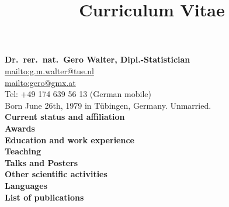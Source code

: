\documentclass[a4paper]{simplecv}
\begin{document}
\pagestyle{myheadings}




\title{Curriculum Vitae}
\nocite{itip-statinf,Troffaes2014a,diss,Walter2012b,Troffaes2012a,Walter2011a,Walter2010a,%
Walter2009b,Walter2009a,Walter2007c,Walter2007b,Walter2007a,Walter2006a}

\vspace*{-10ex}
\maketitle

\textbf{\large Dr.\ rer.\ nat.\ Gero Walter, Dipl.-Statistician}\\[2ex]
\url{mailto:g.m.walter@tue.nl}\\
\url{mailto:gero@gmx.at}\\
Tel: +49 174 639 56 13 (German mobile)\\

Born June 26th, 1979 in T\"{u}bingen, Germany. Unmarried.\\

\textbf{\sf Current status and affiliation} \dotfill \pageref{current}\\
\textbf{\sf Awards} \dotfill \pageref{awards}\\
\textbf{\sf Education and work experience} \dotfill \pageref{education}\\
\textbf{\sf Teaching} \dotfill \pageref{teaching}\\
\textbf{\sf Talks and Posters} \dotfill \pageref{talks}\\
\textbf{\sf Other scientific activities} \dotfill \pageref{other}\\
\textbf{\sf Languages} \dotfill \pageref{languages}\\
\textbf{\sf List of publications} \dotfill \pageref{publications}\\
\end{document}
